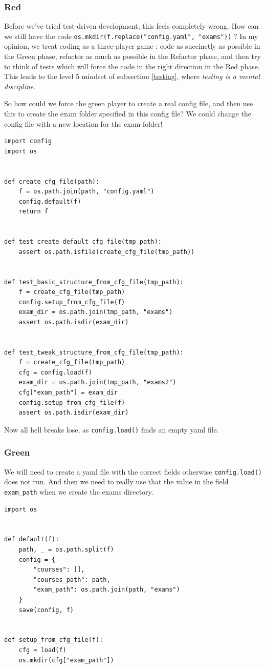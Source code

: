 \documentclass[10pt]{article}
\begin{document}
\subsubsection{Red}
Before we've tried test-driven development, this feels completely wrong. How can we still have the code \texttt{os.mkdir(f.replace("config.yaml", "exams"))} ? In my opinion, we treat coding as a three-player game : code as succinctly as possible in the Green phase, refactor as much as possible in the Refactor phase, and then try to think of tests which will force the code in the right direction in the Red phase. This leads to the level 5 mindset of subsection \ref{testing}, where \emph{testing is a mental discipline}.

So how could we force the green player to create a real config file, and then use this to create the exam folder specified in this config file? We could change the config file with a new location for the exam folder!
\begin{lstlisting}
import config
import os


def create_cfg_file(path):
    f = os.path.join(path, "config.yaml")
    config.default(f)
    return f


def test_create_default_cfg_file(tmp_path):
    assert os.path.isfile(create_cfg_file(tmp_path))


def test_basic_structure_from_cfg_file(tmp_path):
    f = create_cfg_file(tmp_path)
    config.setup_from_cfg_file(f)
    exam_dir = os.path.join(tmp_path, "exams")
    assert os.path.isdir(exam_dir)


def test_tweak_structure_from_cfg_file(tmp_path):
    f = create_cfg_file(tmp_path)
    cfg = config.load(f)
    exam_dir = os.path.join(tmp_path, "exams2")
    cfg["exam_path"] = exam_dir
    config.setup_from_cfg_file(f)
    assert os.path.isdir(exam_dir)
\end{lstlisting}
Now all hell breaks lose, as \texttt{config.load()} finds an empty yaml file.

\subsubsection{Green}
We will need to create a yaml file with the correct fields otherwise \texttt{config.load()} does not run. And then we need to really use that the value in the field \texttt{exam\_path} when we create the exams directory.
\begin{lstlisting}
import os


def default(f):
    path, _ = os.path.split(f)
    config = {
        "courses": [],
        "courses_path": path,
        "exam_path": os.path.join(path, "exams")
    }
    save(config, f)


def setup_from_cfg_file(f):
    cfg = load(f)
    os.mkdir(cfg["exam_path"])
\end{lstlisting}
\end{document}

